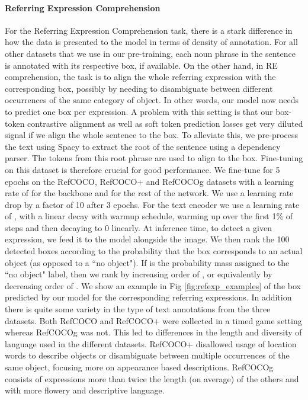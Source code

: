 \paragraph{Referring Expression Comprehension} For the Referring Expression Comprehension task, there is a stark difference in how the data is presented to the model in terms of density of annotation. For all other datasets that we use in our pre-training, each noun phrase in the sentence is annotated with its respective box, if available. On the other hand, in RE comprehension, the task is to align the whole referring expression with the corresponding box, possibly by needing to disambiguate between different occurrences of the same category of object. In other words, our model now needs to predict one box per expression. A problem with this setting is that our box-token contrastive alignment as well as soft token prediction losses get very diluted signal if we align the whole sentence to the box. To alleviate this, we pre-process the text using Spacy \cite{spacy} to extract the root of the sentence using a dependency parser. The tokens from this root phrase are used to align to the box.
Fine-tuning on this dataset is therefore crucial for good performance. We fine-tune for 5 epochs on the RefCOCO, RefCOCO+ and RefCOCOg datasets with a learning rate of  for the backbone and  for the rest of the network. We use a learning rate drop by a factor of 10 after 3 epochs. For the text encoder we use a learning rate of , with a linear decay with warmup schedule, warming up over the first 1\% of steps and then decaying to 0 linearly. At inference time, to detect a given expression, we feed it to the model alongside the image. We then rank the 100 detected boxes according to the probability that the box corresponds to an actual object (as opposed to a ``no object"). If  is the probability mass assigned to the ``no object" label, then we rank by increasing order of , or equivalently by decreasing order of . We show an example in Fig \ref{fig:refexp_examples} of the box predicted by our model for the corresponding referring expressions. 
In addition there is quite some variety in the type of text annotations from the three datasets. Both RefCOCO and RefCOCO+ were collected in a timed game setting whereas RefCOCOg was not. This led to differences in the length and diversity of language used in the different datasets. RefCOCO+ disallowed usage of location words to describe objects or disambiguate between multiple occurrences of the same object, focusing more on appearance based descriptions. RefCOCOg consists of expressions more than twice the length (on average) of the others and with more flowery and descriptive language.

